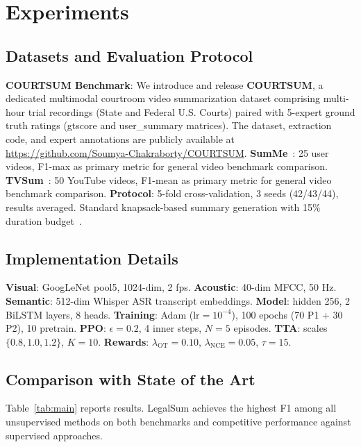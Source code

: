 \documentclass[letterpaper]{article}
\begin{document}
\section{Experiments}
\label{sec:experiments}

\subsection{Datasets and Evaluation Protocol}

\textbf{COURTSUM Benchmark}: We introduce and release \textbf{COURTSUM}, a dedicated multimodal courtroom video summarization dataset comprising multi-hour trial recordings (State and Federal U.S. Courts) paired with 5-expert ground truth ratings (gtscore and user\_summary matrices). The dataset, extraction code, and expert annotations are publicly available at \url{https://github.com/Soumya-Chakraborty/COURTSUM}.
\textbf{SumMe}~\cite{gygli2014creating}: 25 user videos, F1-max as primary metric for general video benchmark comparison.
\textbf{TVSum}~\cite{song2015tvsum}: 50 YouTube videos, F1-mean as primary metric for general video benchmark comparison.
\textbf{Protocol}: 5-fold cross-validation, 3 seeds (42/43/44), results averaged. Standard knapsack-based summary generation with 15\% duration budget~\cite{zhang2016video}.

\subsection{Implementation Details}

\textbf{Visual}: GoogLeNet pool5, 1024-dim, 2 fps.
\textbf{Acoustic}: 40-dim MFCC, 50 Hz.
\textbf{Semantic}: 512-dim Whisper ASR transcript embeddings.
\textbf{Model}: hidden 256, 2 BiLSTM layers, 8 heads.
\textbf{Training}: Adam ($\text{lr}=10^{-4}$), 100 epochs (70 P1 + 30 P2), 10 pretrain.
\textbf{PPO}: $\epsilon=0.2$, 4 inner steps, $N=5$ episodes.
\textbf{TTA}: scales $\{0.8, 1.0, 1.2\}$, $K=10$.
\textbf{Rewards}: $\lambda_{\text{OT}}=0.10$, $\lambda_{\text{NCE}}=0.05$, $\tau=15$.

\subsection{Comparison with State of the Art}

Table~\ref{tab:main} reports results. LegalSum achieves the highest F1 among
all unsupervised methods on both benchmarks and competitive performance against
supervised approaches.
\end{document}
